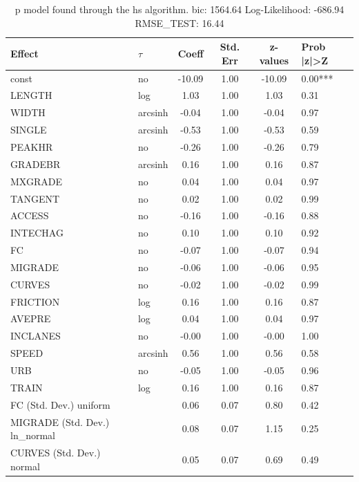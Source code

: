 \begin{table}
	\caption{p model found through the hs algorithm. bic: 1564.64 Log-Likelihood: -686.94 RMSE_TEST: 16.44}
	\begin{center}
		\begin{tabular}{|l|l|c|c|c|l|}
			\hline
			Effect & $\tau$ & Coeff & Std. Err & z-values & Prob |z|>Z \\
			\hline
			const & no & -10.09 & 1.00 & -10.09 & 0.00*** \\
			\hline
			LENGTH & log & 1.03 & 1.00 & 1.03 & 0.31 \\
			\hline
			WIDTH & arcsinh & -0.04 & 1.00 & -0.04 & 0.97 \\
			\hline
			SINGLE & arcsinh & -0.53 & 1.00 & -0.53 & 0.59 \\
			\hline
			PEAKHR & no & -0.26 & 1.00 & -0.26 & 0.79 \\
			\hline
			GRADEBR & arcsinh & 0.16 & 1.00 & 0.16 & 0.87 \\
			\hline
			MXGRADE & no & 0.04 & 1.00 & 0.04 & 0.97 \\
			\hline
			TANGENT & no & 0.02 & 1.00 & 0.02 & 0.99 \\
			\hline
			ACCESS & no & -0.16 & 1.00 & -0.16 & 0.88 \\
			\hline
			INTECHAG & no & 0.10 & 1.00 & 0.10 & 0.92 \\
			\hline
			FC & no & -0.07 & 1.00 & -0.07 & 0.94 \\
			\hline
			MIGRADE & no & -0.06 & 1.00 & -0.06 & 0.95 \\
			\hline
			CURVES & no & -0.02 & 1.00 & -0.02 & 0.99 \\
			\hline
			FRICTION & log & 0.16 & 1.00 & 0.16 & 0.87 \\
			\hline
			AVEPRE & log & 0.04 & 1.00 & 0.04 & 0.97 \\
			\hline
			INCLANES & no & -0.00 & 1.00 & -0.00 & 1.00 \\
			\hline
			SPEED & arcsinh & 0.56 & 1.00 & 0.56 & 0.58 \\
			\hline
			URB & no & -0.05 & 1.00 & -0.05 & 0.96 \\
			\hline
			TRAIN & log & 0.16 & 1.00 & 0.16 & 0.87 \\
			\hline
			FC (Std. Dev.) uniform &  & 0.06 & 0.07 & 0.80 & 0.42 \\
			\hline
			MIGRADE (Std. Dev.) ln_normal &  & 0.08 & 0.07 & 1.15 & 0.25 \\
			\hline
			CURVES (Std. Dev.) normal &  & 0.05 & 0.07 & 0.69 & 0.49 \\

\end{tabular}
\end{center}
\end{table}
